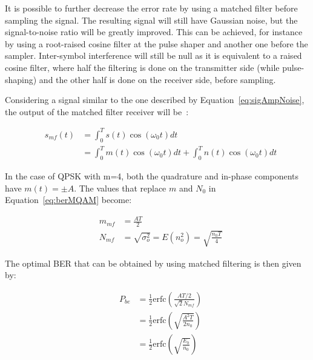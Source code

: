 
It is possible to further decrease the error rate by using a matched filter before sampling the signal. The resulting signal will still have Gaussian noise, but the signal-to-noise ratio will be greatly improved. This can be achieved, for instance by using a root-raised cosine filter at the pulse shaper and another one before the sampler. Inter-symbol interference will still be null as it is equivalent to a raised cosine filter, where half the filtering is done on the transmitter side (while pulse-shaping) and the other half is done on the receiver side, before sampling.

Considering a signal similar to the one described by Equation~\ref{eq:sigAmpNoise}, the output of the matched filter receiver will be~\cite{mischasch}:

\begin{eqnarray}
&s_{mf} (t) &= \int_{0}^{T} s(t)\cos(\omega_0 t ) dt\nonumber\\ 
&	       &= \int_{0}^{T} m(t) \cos(\omega_0 t ) dt + \int_{0}^{T} n(t) \cos(\omega_{0} t ) dt
\end{eqnarray}

In the case of QPSK with m=4, both the quadrature and in-phase components have $m(t) = \pm A$. The values that replace $m$ and $N_0$ in Equation~\ref{eq:berMQAM} become:

\begin{eqnarray}
&m_{mf} &= \frac{A T}{2}\\
&N_{mf} &= \sqrt{\sigma_o^2} = E(n_o^2) = \sqrt{\frac{n_0 T}{4}}
\end{eqnarray}


The optimal BER that can be obtained by using matched filtering is then given by:

\begin{eqnarray}\label{eq:berBPSK}
&P_{be} &= \frac{1}{2} \text{erfc}\left({\frac{AT/2}{\sqrt{2} N_{mf}}}\right)\nonumber\\
&	    &= \frac{1}{2} \text{erfc}\left(\sqrt{{\frac{A^2T}{2 n_0}}}\right)\\
&	    &= \frac{1}{2} \text{erfc}\left(\sqrt{{\frac{E_b}{n_0}}}\right)\nonumber
\end{eqnarray}

